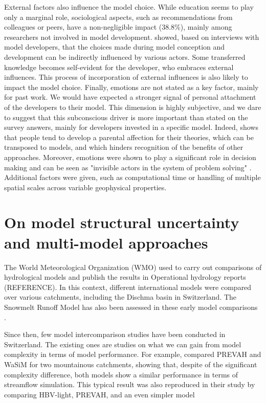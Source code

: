 \documentclass[10pt,a4paper]{article}
\begin{document}
External factors also influence the model choice. While education seems to play only a marginal role, sociological aspects, such as recommendations from colleagues or peers, have a non-negligible impact (38.8\%), mainly among researchers not involved in model development. \citet{Babel2019} showed, based on interviews with model developers, that the choices made during model conception and development can be indirectly influenced by various actors. Some transferred knowledge becomes self-evident for the developer, who embraces external influences. This process of incorporation of external influences is also likely to impact the model choice. 
Finally, emotions are not stated as a key factor, mainly for past work. We would have expected a stronger signal of personal attachment of the developers to their model. This dimension is highly subjective, and we dare to suggest that this subconscious driver is more important than stated on the survey answers, mainly for developers invested in a specific model. Indeed, \citet{Chamberlin1890} shows that people tend to develop a parental affection for their theories, which can be transposed to models, and which hinders recognition of the benefits of other approaches. Moreover, emotions were shown to play a significant role in decision making and can be seen as "invisible actors in the system of problem solving" \citep{Hamalainen2015}. Additional factors were given, such as computational time or handling of multiple spatial scales across variable geophysical properties.


\section{On model structural uncertainty and multi-model approaches}
\label{sec:multi-model}

The World Meteorological Organization (WMO) used to carry out comparisons of hydrological models and publish the results in Operational hydrology reports (REFERENCE). In this context, different international models were compared over various catchments, including the Dischma basin in Switzerland. The Snowmelt Runoff Model \citep[SRM,][see supplementary material]{Martinec1975} has also been assessed in these early model comparisons \citep{WMO1986, WMO1992a}.

Since then, few model intercomparison studies have been conducted in Switzerland. The existing ones are studies on what we can gain from model complexity in terms of model performance. For example, \citet{Gurtz2003} compared PREVAH and WaSiM for two mountainous catchments, showing that, despite of the significant complexity difference, both models show a similar performance in terms of streamflow simulation. This typical result was also reproduced in their study by \citet{Orth2015} comparing HBV-light, PREVAH, and an even simpler model 
\end{document}
